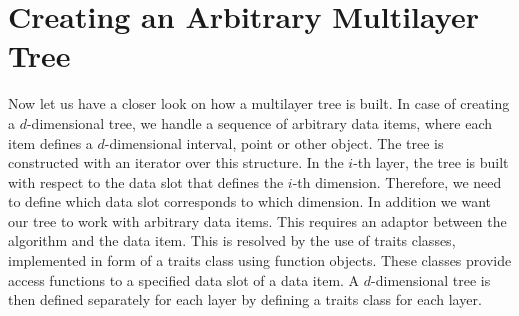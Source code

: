 \section{Creating an Arbitrary Multilayer Tree}
\label{general}

Now let us have a closer look on how a multilayer tree is built.
In case of creating a $d$-dimensional tree,  we handle a
sequence of arbitrary data
items, where each item  defines a $d$-dimensional interval, point
or other object. The tree is constructed with an iterator over
this structure. In the $i$-th layer, the tree is
built with respect to the data slot that defines the $i$-th
dimension. Therefore, we need to define which data slot
corresponds to which dimension.
In addition we want our tree to work with arbitrary data items.
This requires an
adaptor between the algorithm and the data item. This is resolved
by the use of traits classes, implemented in
form of a traits class using
function objects.
These classes provide
access functions to a specified data slot of a data item.
A $d$-dimensional tree is then defined separately for each layer by
defining a traits class for each layer.


